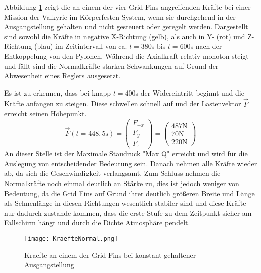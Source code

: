 Abbildung \ref{abb_KraefteNormal} zeigt die an einem der vier Grid Fins angreifenden Kräfte bei einer Mission der Valkyrie im Körperfesten System, wenn sie durchgehend in der Ausgangstellung gehalten und nicht gesteuert oder geregelt werden. Dargestellt sind sowohl die Kräfte in negative X-Richtung (gelb), als auch in Y- (rot) und Z-Richtung (blau) im Zeitintervall von ca. $t=380$s bis $t=600$s nach der Entkoppelung von den Pylonen. Während die Axialkraft relativ monoton steigt und fällt sind die Normalkräfte starken Schwankungen auf Grund der Abwesenheit eines Reglers ausgesetzt.

Es ist zu erkennen, dass bei knapp $t=400$s der Widereintritt beginnt und die Kräfte anfangen zu steigen. Diese schwellen schnell auf und der Lastenvektor $\vec{F}$ erreicht seinen Höhepunkt.
\begin{equation}
	\vec{F}(t=448,5\mathrm{s})=
		\left(\begin{array}{c}F_{-x}\\F_y\\F_z\end{array}\right)
			=\left(\begin{array}{c}487\mathrm{N}\\70\mathrm{N}\\220\mathrm{N}\end{array}\right)
\end{equation}
An dieser Stelle ist der Maximale Staudruck "Max Q" erreicht und wird für die Auslegung von entscheidender Bedeutung sein. Danach nehmen alle Kräfte wieder ab, da sich die Geschwindigkeit verlangsamt. Zum Schluss nehmen die Normalkräfte noch einmal deutlich an Stärke zu, dies ist jedoch weniger von Bedeutung, da die Grid Fins auf Grund ihrer deutlich größeren Breite und Länge als Sehnenlänge in diesen Richtungen wesentlich stabiler sind und diese Kräfte nur dadurch zustande kommen, dass die erste Stufe zu dem Zeitpunkt sicher am Fallschirm hängt und durch die Dichte Atmosphäre pendelt.
\begin{figure}[h]
	\centering
	\texttt{[image: KraefteNormal.png]}
	\caption{Kraefte an einem der Grid Fins bei konstant gehaltener Ausgangstellung}
	\label{abb_KraefteNormal}
\end{figure}\\
